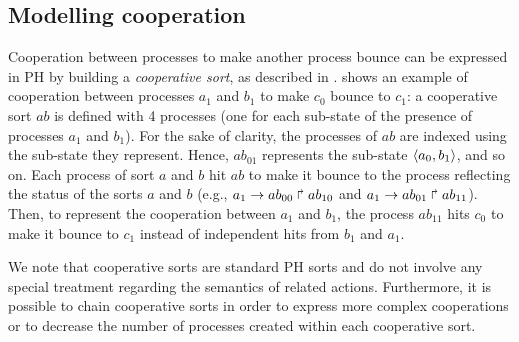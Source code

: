 \subsection{Modelling cooperation}
Cooperation between processes to make another process bounce can be expressed in PH by building a \emph{cooperative sort}, as described in \cite{PMR10-TCSB}.
 shows an example of cooperation between processes $a_1$ and $b_1$ to make $c_0$ bounce to $c_1$:
a cooperative sort $ab$ is defined with 4 processes (one for each sub-state of the presence of processes $a_1$ and $b_1$).
For the sake of clarity, the processes of $ab$ are indexed using the sub-state they represent.
Hence, $ab_{01}$ represents the sub-state $\mbox{$\langle a_0,b_1 \rangle$}$, and so on.
Each process of sort $a$ and $b$ hit $ab$ to make it bounce to the process reflecting the status of the sorts $a$ and $b$
(e.g., $a_1\rightarrow ab_{00}\Rsh ab_{10}$ and $a_1\rightarrow ab_{01}\Rsh ab_{11}$).
Then, to represent the cooperation between $a_1$ and $b_1$, the process $ab_{11}$ hits $c_0$ to make it bounce to $c_1$ instead of independent hits from $b_1$ and $a_1$.

We note that cooperative sorts are standard PH sorts and do not involve any
special treatment regarding the semantics of related actions.
Furthermore, it is possible to chain cooperative sorts in order to express more complex cooperations
or to decrease the number of processes created within each cooperative sort.

\begin{comment}
When the number of cooperating processes is large, it is possible to chain several cooperative sorts
to prevent the combinatoric explosion of the number of processes created within cooperative sorts.
For instance, if $b_1$, $c_1$, and $d_1$ cooperate, one can create a cooperative sort $bc$ with 4
processes reflecting the presence of $b_1$ and $c_1$, and a cooperative sort $bcd$ with 4 processes
reflecting the presence of $bc_{11}$ and $d_1$.  Such constructions are helpful in PH
as the static analysis of dynamics developed in \cite{PMR12-MSCS} does not suffer from the number of
sorts, but on the number of processes within a single sort.
\end{comment}


